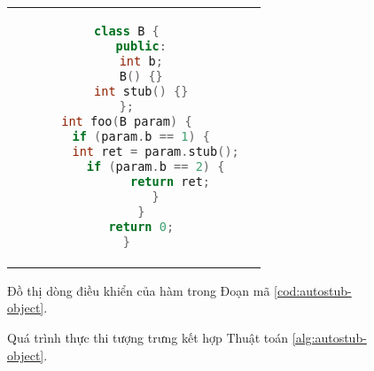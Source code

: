 \begin{figure}[h]
	\begin{tabular}{cc}
		\begin{minipage}[b]{0.5\textwidth}
			\begin{lstlisting}[language=C++, caption={Mã nguồn minh họa phương pháp tạo stub tự động cho phương thức của đối tượng.}, label={cod:autostub-object}, captionpos=b]
class B {
	public:
	int b;
	B() {}
	int stub() {}
};
int foo(B param) {
	if (param.b == 1) {
		int ret = param.stub();
		if (param.b == 2) {
			return ret;
		}
	}
	return 0;
}
			\end{lstlisting}
		\end{minipage}
		& \begin{minipage}[b]{0.4\textwidth}
			\centering
			
			\caption{Đồ thị dòng điều khiển của hàm \tcode{foo(B param)} trong Đoạn mã \autoref{cod:autostub-object}.}
			\label{fig:cfg-object}
		\end{minipage}
	\end{tabular}
\end{figure}

\begin{figure}[h]
	\centering
	
	\caption{Quá trình thực thi tượng trưng kết hợp Thuật toán \autoref{alg:autostub-object}.}
	\label{fig:autostub-sample}
\end{figure}

